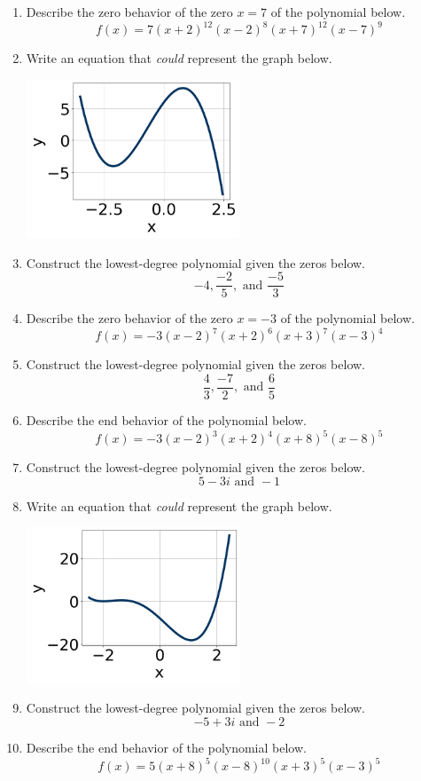 \documentclass[14pt]{extbook}
\begin{document}
\begin{enumerate}
\item{
Describe the zero behavior of the zero $x = 7$ of the polynomial below.\[ f(x) = 7(x + 2)^{12}(x - 2)^{8}(x + 7)^{12}(x - 7)^{9} \]} \newpage
\item{
Write an equation that \textit{could} represent the graph below.
\begin{center}
    \includegraphics[width=0.5\textwidth]{../Figures/polyGraphToFunctionA.png}
\end{center}
} \newpage
\item{
Construct the lowest-degree polynomial given the zeros below.\[ -4, \frac{-2}{5}, \text{ and } \frac{-5}{3} \]} \newpage
\item{
Describe the zero behavior of the zero $x = -3$ of the polynomial below.\[ f(x) = -3(x - 2)^{7}(x + 2)^{6}(x + 3)^{7}(x - 3)^{4} \]} \newpage
\item{
Construct the lowest-degree polynomial given the zeros below.\[ \frac{4}{3}, \frac{-7}{2}, \text{ and } \frac{6}{5} \]} \newpage
\item{
Describe the end behavior of the polynomial below.\[ f(x) = -3(x - 2)^{3}(x + 2)^{4}(x + 8)^{5}(x - 8)^{5} \]} \newpage
\item{
Construct the lowest-degree polynomial given the zeros below.\[ 5 - 3 i \text{ and } -1 \]} \newpage
\item{
Write an equation that \textit{could} represent the graph below.
\begin{center}
    \includegraphics[width=0.5\textwidth]{../Figures/polyGraphToFunctionCopyA.png}
\end{center}
} \newpage
\item{
Construct the lowest-degree polynomial given the zeros below.\[ -5 + 3 i \text{ and } -2 \]} \newpage
\item{
Describe the end behavior of the polynomial below.\[ f(x) = 5(x + 8)^{5}(x - 8)^{10}(x + 3)^{5}(x - 3)^{5} \]} \newpage
\end{enumerate}
\end{document}
